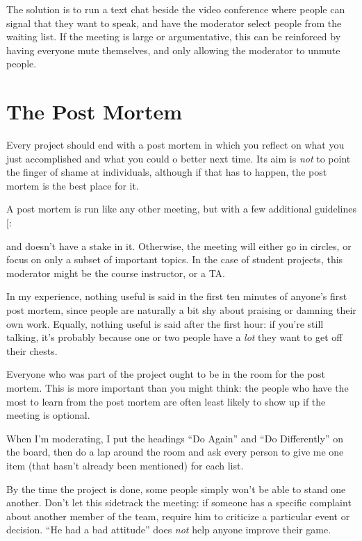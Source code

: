 The solution is to run a text chat beside the video conference where
people can signal that they want to speak, and have the moderator select
people from the waiting list. If the meeting is large or argumentative,
this can be reinforced by having everyone mute themselves, and only
allowing the moderator to unmute people.

\section{The Post Mortem}\label{the-post-mortem}

Every project should end with a post mortem in which you reflect on what
you just accomplished and what you could o better next time. Its aim is
\emph{not} to point the finger of shame at individuals, although if that has
to happen, the post mortem is the best place for it.

A post mortem is run like any other meeting, but with a few additional
guidelines {[}\protect[\hyperlink{b:Derb2006}{Derb2006}]{]}:

\begin{description}
\tightlist
\item[Get a moderator who wasn't part of the project]
and doesn't have a stake in it. Otherwise, the meeting will either
go in circles, or focus on only a subset of important topics. In the
case of student projects, this moderator might be the course
instructor, or a TA.
\item[Set aside an hour, and only an hour.]
In my experience, nothing useful is said in the first ten minutes of
anyone's first post mortem, since people are naturally a bit shy
about praising or damning their own work. Equally, nothing useful is
said after the first hour: if you're still talking, it's probably
because one or two people have a \emph{lot} they want to get off their
chests.
\item[Require attendance.]
Everyone who was part of the project ought to be in the room for the
post mortem. This is more important than you might think: the people
who have the most to learn from the post mortem are often least
likely to show up if the meeting is optional.
\item[Make two lists.]
When I'm moderating, I put the headings ``Do Again'' and ``Do
Differently'' on the board, then do a lap around the room and ask
every person to give me one item (that hasn't already been
mentioned) for each list.
\item[Comment on actions, rather than individuals.]
By the time the project is done, some people simply won't be able to
stand one another. Don't let this sidetrack the meeting: if someone
has a specific complaint about another member of the team, require
him to criticize a particular event or decision. ``He had a bad
attitude'' does \emph{not} help anyone improve their game.
\end{description}

